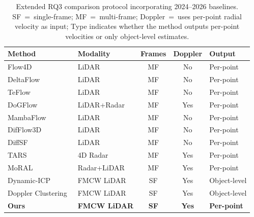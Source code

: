 \begin{table}[ht]
\centering
\caption{Extended RQ3 comparison protocol incorporating 2024--2026 baselines. SF~=~single-frame; MF~=~multi-frame; Doppler~=~uses per-point radial velocity as input; Type indicates whether the method outputs per-point velocities or only object-level estimates.}
\label{tab:rq3_baselines_extended}
\small
\begin{tabular}{l l c c l}
\toprule
Method & Modality & Frames & Doppler & Output \\
\midrule
Flow4D~\cite{cho2025flow4d}                & LiDAR        & MF & No  & Per-point \\
DeltaFlow~\cite{zhang2025deltaflow}        & LiDAR        & MF & No  & Per-point \\
TeFlow~\cite{zhang2026teflow}              & LiDAR        & MF & No  & Per-point \\
DoGFlow~\cite{khoche2026dogflow}           & LiDAR+Radar  & MF & Yes & Per-point \\
MambaFlow~\cite{ma2025mambaflow}           & LiDAR        & MF & No  & Per-point \\
DifFlow3D~\cite{liu2024difflow3d}          & LiDAR        & MF & No  & Per-point \\
DiffSF~\cite{zhang2024diffsf}              & LiDAR        & MF & No  & Per-point \\
TARS~\cite{wu2025tars}                     & 4D Radar     & MF & Yes & Per-point \\
MoRAL~\cite{lin2025moral}                  & Radar+LiDAR  & MF & Yes & Per-point \\
Dynamic-ICP~\cite{dynamicicp2025}          & FMCW LiDAR   & SF & Yes & Object-level \\
Doppler Clustering~\cite{ding2022doppler_clustering} & FMCW LiDAR & SF & Yes & Object-level \\
\midrule
\textbf{Ours} & \textbf{FMCW LiDAR} & \textbf{SF} & \textbf{Yes} & \textbf{Per-point} \\
\bottomrule
\end{tabular}
\end{table}
